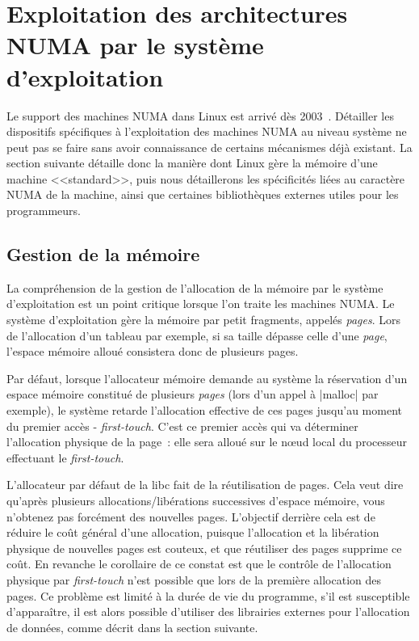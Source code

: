 \section{Exploitation des architectures NUMA par le système d'exploitation}\label{sec:context:os}

Le support des machines NUMA dans Linux est arrivé dès 2003~\cite{Dobson2003}.
Détailler les dispositifs spécifiques à l'exploitation des machines NUMA au niveau système ne peut pas se faire sans avoir connaissance de certains mécanismes déjà existant.
La section suivante détaille donc la manière dont Linux gère la mémoire d'une machine <<standard>>, puis nous détaillerons les spécificités liées au caractère NUMA de la machine, ainsi que certaines bibliothèques externes utiles pour les programmeurs.

\subsection{Gestion de la mémoire}

La compréhension de la gestion de l'allocation de la mémoire par le système d'exploitation est un point critique lorsque l'on traite les machines NUMA.
Le système d'exploitation gère la mémoire par petit fragments, appelés \emph{pages}.
Lors de l'allocation d'un tableau par exemple, si sa taille dépasse celle d'une \emph{page}, l'espace mémoire alloué consistera donc de plusieurs pages.


Par défaut, lorsque l'allocateur mémoire demande au système la réservation d'un espace mémoire constitué de plusieurs \emph{pages} (lors d'un appel à |malloc| par exemple), le système retarde l'allocation effective de ces pages jusqu'au moment du premier accès - \emph{first-touch}.
C'est ce premier accès qui va déterminer l'allocation physique de la page~: elle sera alloué sur le nœud local du processeur effectuant le \emph{first-touch}.

L'allocateur par défaut de la libc fait de la réutilisation de pages. Cela veut dire qu'après plusieurs allocations/libérations successives d'espace mémoire, vous n'obtenez pas forcément des nouvelles pages.
L'objectif derrière cela est de réduire le coût général d'une allocation, puisque l'allocation et la libération physique de nouvelles pages est couteux, et que réutiliser des pages supprime ce coût.
En revanche le corollaire de ce constat est que le contrôle de l'allocation physique par \emph{first-touch} n'est possible que lors de la première allocation des pages.
Ce problème est limité à la durée de vie du programme, s'il est susceptible d'apparaître, il est alors possible d'utiliser des librairies externes pour l'allocation de données, comme décrit dans la section suivante.

